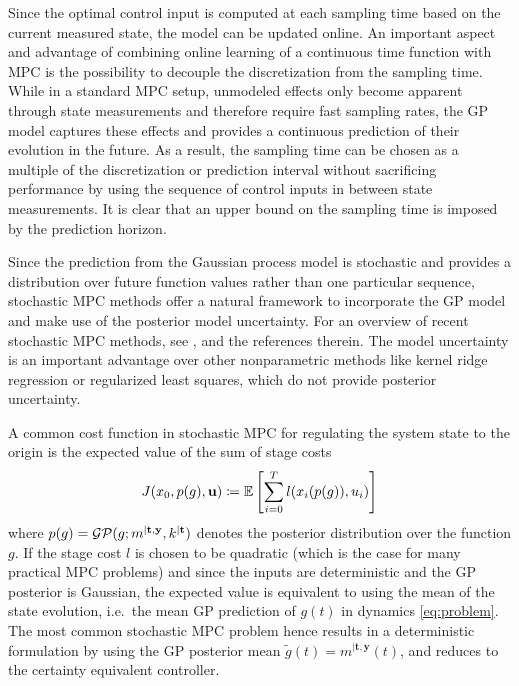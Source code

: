 Since the optimal control input is computed at each sampling time based on the
current measured state, the model can be updated online. An important aspect
and advantage of combining online learning of a continuous time function with
MPC is the possibility to decouple the discretization from the sampling time.
While in a standard MPC setup, unmodeled effects only become apparent through
state measurements and therefore require fast sampling rates, the GP model
captures these effects and provides a continuous prediction of their evolution
in the future. As a result, the sampling time can be chosen as a multiple of
the discretization or prediction interval without sacrificing performance by
using the sequence of control inputs in between state measurements. It is clear
that an upper bound on the sampling time is imposed by the prediction horizon.

Since the prediction from the Gaussian process model is stochastic and provides
a distribution over future function values rather than one particular sequence,
stochastic MPC methods offer a natural framework to incorporate the GP model
and make use of the posterior model uncertainty. For an overview of recent
stochastic MPC methods, see \eg \cite{Kouvaritakis.Cannon:2014:Stochastic},
\cite{Mayne:2014:Model} and the references therein. The model uncertainty is an
important advantage over other nonparametric methods like kernel ridge
regression or regularized least squares, which do not provide posterior
uncertainty.

A common cost function in stochastic MPC for regulating the system state to the
origin is the expected value of the sum of stage costs
\vspace{-\baselineskip}
\begin{equation}
J(x_0,p(g),\mathbf{u}) \coloneqq \mathbb{E}\left[\sum_{i=0}^{T}
l(x_i(p(g)), u_i) \right]
\end{equation}
where $p(g) = \mathcal{GP}(g;m^{|\mathbf{t},\mathbf{y}},k^{|\mathbf{t}})$ denotes the
posterior distribution over the function $g$. If the stage cost $l$ is chosen to
be quadratic (which is the case for many practical MPC problems) and since the
inputs are deterministic and the GP posterior is Gaussian, the expected value is
equivalent to using the mean of the state evolution, i.e.\ the mean GP
prediction of $g(t)$ in dynamics \eqref{eq:problem}. The most common stochastic
MPC problem hence results in a deterministic formulation by using the GP
posterior mean $\tilde g(t) = m^{|\mathbf{t},\mathbf{y}}(t)$, and reduces to the
certainty equivalent controller.

